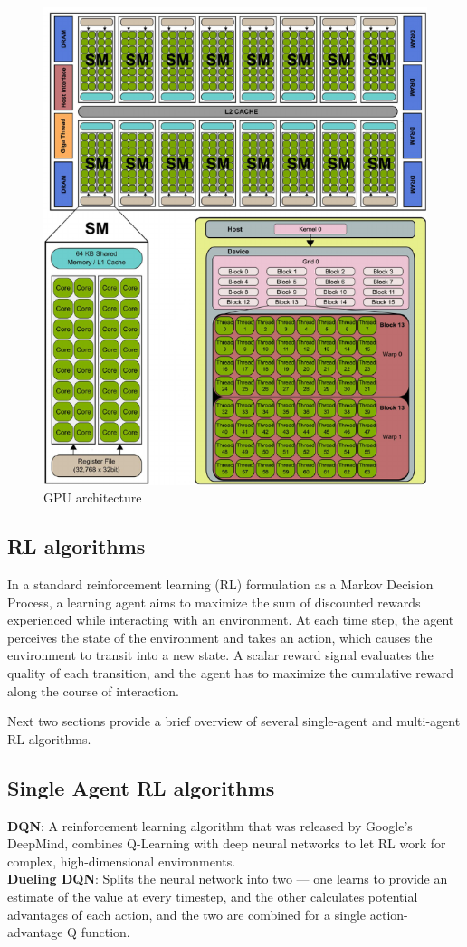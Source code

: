 \documentclass[11 pt, twocolumn]{article}
\begin{document}
\begin{figure}
\centering
\includegraphics[width=0.93\columnwidth]{gpu_arch.png}
\caption{GPU architecture}
\vspace*{2pt}
\end{figure}

\subsection{RL algorithms}
In a standard reinforcement learning (RL) formulation as a Markov Decision Process, a learning agent aims to maximize the sum of discounted rewards experienced while interacting with an environment.
At each time step, the agent perceives the state of the environment and
takes an action, which causes the environment to transit into a new state. A scalar reward
signal evaluates the quality of each transition, and the agent has to maximize the cumulative reward along the course of interaction.

Next two sections provide a brief overview of several single-agent and multi-agent RL algorithms.

\subsection{Single Agent RL algorithms}
\textbf{DQN}: A reinforcement learning algorithm that was released by Google’s DeepMind, combines Q-Learning with deep neural networks to let RL work for complex, high-dimensional environments. \\
\textbf{Dueling DQN}: Splits the neural network into two — one learns to provide an estimate of the value at every timestep, and the other calculates potential advantages of each action, and the two are combined for a single action-advantage Q function.
\end{document}
